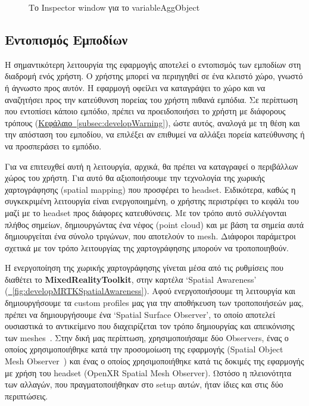 \begin{figure}[!h]
\begin{subfigure}{0.5\textwidth}
        \caption{}
    \end{subfigure}%
    \caption{Το Inspector window για το variableAggObject}\label{fig:developInspVariableAggObject}
\end{figure}

\subsection{Εντοπισμός Εμποδίων}\label{subsec:developObstacleDetection}

Η σημαντικότερη λειτουργία της εφαρμογής αποτελεί ο εντοπισμός των εμποδίων στη διαδρομή ενός χρήστη. Ο χρήστης μπορεί να περιηγηθεί σε ένα κλειστό χώρο, γνωστό ή άγνωστο προς αυτόν. Η εφαρμογή οφείλει να καταγράψει το χώρο και να αναζητήσει προς την κατεύθυνση πορείας του χρήστη πιθανά εμπόδια. Σε περίπτωση που εντοπίσει κάποιο εμπόδιο, πρέπει να προειδοποιήσει το χρήστη με διάφορους τρόπους (\hyperref[subsec:developWarning]{Κεφάλαιο~\ref*{subsec:developWarning}}), ώστε αυτός, αναλογά με τη θέση και την απόσταση του εμποδίου, να επιλέξει αν επιθυμεί να αλλάξει πορεία κατεύθυνσης ή να προσπεράσει το εμπόδιο.

Για να επιτευχθεί αυτή η λειτουργία, αρχικά, θα πρέπει να καταγραφεί ο περιβάλλων χώρος του χρήστη. Για αυτό θα αξιοποιήσουμε την τεχνολογία της χωρικής χαρτογράφησης (spatial mapping) που προσφέρει το headset. Ειδικότερα, καθώς η συγκεκριμένη λειτουργία είναι ενεργοποιημένη, ο χρήστης περιστρέφει το κεφάλι του μαζί με το headset προς διάφορες κατευθύνσεις. Με τον τρόπο αυτό συλλέγονται πλήθος σημείων, δημιουργώντας ένα νέφος (point cloud) και με βάση τα σημεία αυτά δημιουργείται ένα σύνολο τριγώνων, που αποτελούν το mesh. Διάφοροι παράμετροι σχετικά με τον τρόπο λειτουργίας της χαρτογράφησης μπορούν να τροποποιηθούν.

Η ενεργοποίηση της χωρικής χαρτογράφησης γίνεται μέσα από τις ρυθμίσεις που διαθέτει το  \textbf{MixedRealityToolkit}, στην καρτέλα `Spatial Awareness' (\hyperref[fig:developMRTKSpatialAwareness]{\schema~\ref*{fig:developMRTKSpatialAwareness}}). Αφού ενεργοποιήσουμε τη λειτουργία και δημιουργήσουμε τα custom profiles μας για την αποθήκευση των τροποποιήσεών μας, πρέπει να δημιουργήσουμε ένα `Spatial Surface Observer', το οποίο αποτελεί ουσιαστικά το αντικείμενο που διαχειρίζεται τον τρόπο δημιουργίας και απεικόνισης των meshes~\cite{mattzmsft_2023_spatial}. Στην δική μας περίπτωση, χρησιμοποιήσαμε δύο Observers, ένας ο οποίος χρησιμοποιήθηκε κατά την προσομοίωση της εφαρμογής (Spatial Object Mesh Observer~\cite{davidklinems_2022_spatial}) και ένας ο οποίος χρησιμοποιήθηκε κατά τις δοκιμές της εφαρμογής με χρήση του headset (OpenXR Spatial Mesh Observer). Ωστόσο η πλειονότητα των αλλαγών, που πραγματοποιήθηκαν στο setup αυτών, ήταν ίδιες και στις δύο περιπτώσεις.

